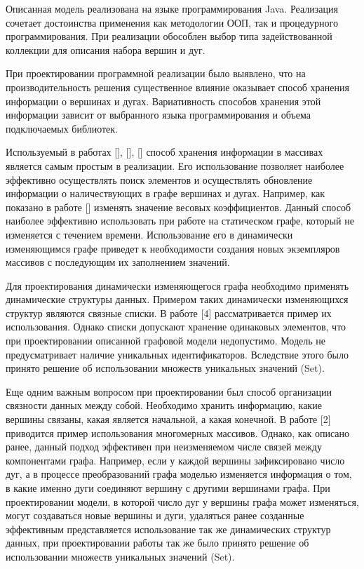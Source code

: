 Описанная модель реализована на языке программирования Java. Реализация сочетает достоинства применения как методологии ООП, так и процедурного программирования. При реализации обособлен выбор типа задействованной коллекции для описания набора вершин и дуг.

При проектировании программной реализации было выявлено, что на производительность решения существенное влияние оказывает способ хранения информации о вершинах и дугах. Вариативность способов хранения этой информации зависит от выбранного языка программирования и объема подключаемых библиотек.

Используемый в работах [], [], [] способ хранения информации в массивах является самым простым в реализации. Его использование позволяет наиболее эффективно осуществлять поиск элементов и осуществлять обновление информации о наличествующих в графе вершинах и дугах. Например, как показано в работе [] изменять значение весовых коэффициентов. Данный способ наиболее эффективно использовать при работе на статическом графе, который не изменяется с течением времени. Использование его в динамически изменяющимся графе приведет к необходимости создания новых экземпляров массивов с последующим их заполнением значений.

Для проектирования динамически изменяющегося графа необходимо применять динамические структуры данных. Примером таких динамически изменяющихся структур являются связные списки. В работе [4] рассматривается пример их использования. Однако списки допускают хранение одинаковых элементов, что при проектировании описанной графовой модели недопустимо. Модель не предусматривает наличие уникальных идентификаторов. Вследствие этого было принято решение об использовании множеств уникальных значений (Set).

Еще одним важным вопросом при проектировании был способ организации связности данных между собой. Необходимо хранить информацию, какие вершины связаны, какая является начальной, а какая конечной. В работе [2] приводится пример использования многомерных массивов. Однако, как описано ранее, данный подход эффективен при неизменяемом числе связей между компонентами графа. Например, если у каждой вершины зафиксировано число дуг, а в процессе преобразований графа моделью изменяется информация о том, в какие именно дуги соединяют вершину с другими вершинами графа. При проектировании модели, в которой число дуг у вершины графа может изменяться, могут создаваться новые вершины и дуги, удаляться ранее созданные эффективным представляется использование так же динамических структур данных, при проектировании работы так же было принято решение об использовании множеств уникальных значений (Set).

